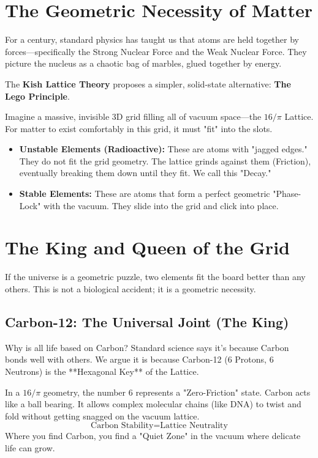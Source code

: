 \documentclass[11pt, letterpaper, openany]{book}
\begin{document}
\section{The Geometric Necessity of Matter}
For a century, standard physics has taught us that atoms are held together by forces—specifically the Strong Nuclear Force and the Weak Nuclear Force. They picture the nucleus as a chaotic bag of marbles, glued together by energy.

The \textbf{Kish Lattice Theory} proposes a simpler, solid-state alternative: \textbf{The Lego Principle}.

Imagine a massive, invisible 3D grid filling all of vacuum space—the $16/\pi$ Lattice. For matter to exist comfortably in this grid, it must "fit" into the slots.
\begin{itemize}
    \item \textbf{Unstable Elements (Radioactive):} These are atoms with "jagged edges." They do not fit the grid geometry. The lattice grinds against them (Friction), eventually breaking them down until they fit. We call this "Decay."
    \item \textbf{Stable Elements:} These are atoms that form a perfect geometric "Phase-Lock" with the vacuum. They slide into the grid and click into place.
\end{itemize}

\section{The King and Queen of the Grid}
If the universe is a geometric puzzle, two elements fit the board better than any others. This is not a biological accident; it is a geometric necessity.

\subsection{Carbon-12: The Universal Joint (The King)}
Why is all life based on Carbon? Standard science says it's because Carbon bonds well with others. We argue it is because Carbon-12 ($6$ Protons, $6$ Neutrons) is the **Hexagonal Key** of the Lattice.



In a $16/\pi$ geometry, the number 6 represents a "Zero-Friction" state. Carbon acts like a ball bearing. It allows complex molecular chains (like DNA) to twist and fold without getting snagged on the vacuum lattice. 
\begin{equation}
    \text{Carbon Stability} = \text{Lattice Neutrality}
\end{equation}
Where you find Carbon, you find a "Quiet Zone" in the vacuum where delicate life can grow.
\end{document}
